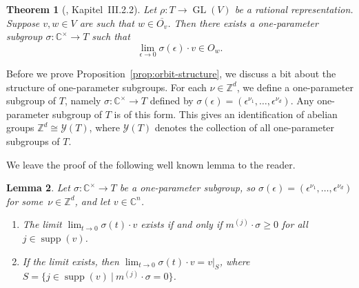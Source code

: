 \documentclass[10pt,a4paper]{article}
\DeclareMathOperator{\supp}{supp}
\DeclareMathOperator{\GL}{GL}
\newtheorem{theorem}{Theorem}[section]
\newtheorem{lemma}[theorem]{Lemma}
\theoremstyle{definition}
\numberwithin{equation}{section}
\newcommand{\CC}{\mathbb{C}}
\newcommand{\ZZ}{\mathbb{Z}}
\begin{document}
\begin{theorem}[\cite{kraft}, Kapitel~III.2.2]{\label{thm:hmtori}}
Let $\rho\colon T \rightarrow \GL(V)$ be a rational representation.
Suppose $v,w \in V$ are such that $w\in\overline{O_v}$.
Then there exists a one-parameter subgroup $\sigma\colon\CC^\times\rightarrow T$ such that
\[
\lim_{\epsilon\to 0}\sigma(\epsilon) \cdot v \in O_w.
\]
\end{theorem}

Before we prove Proposition~\ref{prop:orbit-structure}, we discuss a bit about the structure of one-parameter subgroups.
For each $\nu \in \ZZ^d$, we define a one-parameter subgroup of $T$, namely $\sigma\colon \CC^\times \rightarrow T$ defined
by $\sigma(\epsilon) = (\epsilon^{\nu_1},\ldots,\epsilon^{\nu_d})$.
Any one-parameter subgroup of $T$ is of this form.
This gives an identification of abelian groups $\ZZ^d \cong \mathcal{Y}(T)$, where $\mathcal{Y}(T)$ denotes the collection of all one-parameter subgroups of $T$.

We leave the proof of the following well known lemma to the reader.

\begin{lemma}\label{lem:tori-1psg}
Let $\sigma\colon \CC^\times \rightarrow T$ be a one-parameter subgroup, so $\sigma(\epsilon) = (\epsilon^{\nu_1},\ldots,\epsilon^{\nu_d})$ for some~$\nu\in\ZZ^d$, and let $v\in \CC^n$.
\begin{enumerate}
\item The limit $\lim_{t \to 0} \sigma(t) \cdot v$ exists if and only if $m^{(j)} \cdot \sigma \geq 0$ for all $j \in \supp(v)$.
\item If the limit exists, then $\lim_{t \to 0} \sigma(t) \cdot v = v|_S$, where $S = \{j \in \supp(v) \ | \ m^{(j)} \cdot \sigma =  0\}$.
\end{enumerate}
\end{lemma}
\end{document}
